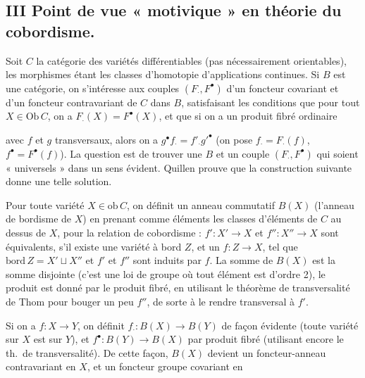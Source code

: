 \documentclass[11pt,a4paper]{article}
\begin{document}

\subsection*{III \quad Point de vue « motivique » en théorie du cobordisme.}

Soit $C$ la catégorie des variétés différentiables  (pas
nécessairement orientables), les morphismes étant les classes d'homotopie
d'applications continues. Si $B$ est une catégorie, on s'intéresse aux couples
$(F_{\cdot}, F^{\bullet})$ d'un foncteur covariant et d'un foncteur
contravariant de $C$ dans $B$, satisfaisant les conditions que pour tout $X
\in \mathrm{Ob}\, C$, on a $F_{\cdot}(X) = F^{\bullet}(X)$, et que si on a un
produit fibré ordinaire


avec $f$ et $g$ transversaux, alors on a $g^{\bullet} f_{\cdot} = f'_{\cdot}
g'^{\bullet}$ (on pose $f_{\cdot} = F_{\cdot}(f)$, $f^{\bullet} =
F^{\bullet}(f)$). La question est de trouver une $B$ et un couple
$(F_{\cdot}, F^{\bullet})$ qui soient « universels » dans un sens évident.
Quillen prouve que la construction suivante donne une telle solution.

Pour toute variété $X \in \mathrm{ob}\, C$, on définit un anneau commutatif
$B(X)$ (l'anneau de bordisme de $X$) en prenant comme éléments les classes
d'éléments de $C$ au dessus de $X$, pour la relation de cobordisme : $f' : X'
\to X$ et $f'' : X'' \to X$ sont équivalents, s'il existe une variété à bord
$Z$, et un $f : Z \to X$, tel que $\mathrm{bord}\, Z = X' \sqcup X''$ et $f'$
et $f''$ sont induits par $f$. La somme de $B(X)$ est la somme disjointe
(c'est une loi de groupe où tout élément est d'ordre 2), le produit est donné
par le produit fibré, en utilisant le théorème de transversalité de Thom pour
bouger un peu $f''$, de sorte à le rendre transversal à $f'$.


Si on a $f : X \to Y$, on définit $f_{\cdot} : B(X) \to B(Y)$ de façon
évidente (toute variété sur $X$ est sur $Y$), et $f^{\bullet} : B(Y) \to B(X)$
par produit fibré (utilisant encore le th.\ de transversalité). De cette
façon, $B(X)$ devient un foncteur-anneau  contravariant en $X$,
et un foncteur groupe covariant en
\end{document}
